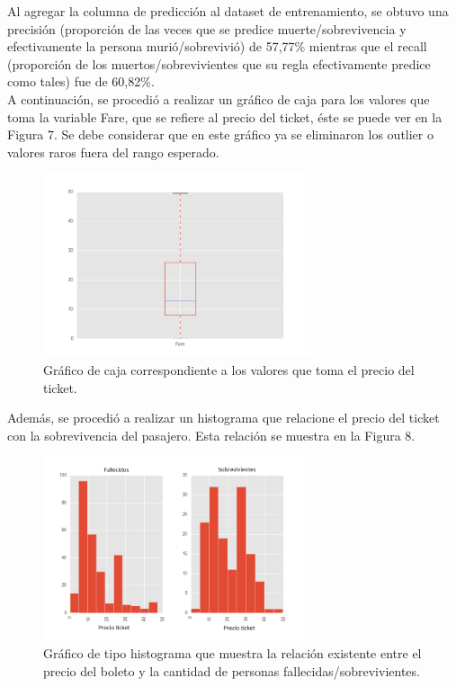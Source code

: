 \documentclass[letter, 10pt]{article}
\begin{document}
Al agregar la columna de predicción al dataset de entrenamiento, se obtuvo una precisión (proporción de las veces que se predice muerte/sobrevivencia y efectivamente la persona murió/sobrevivió) de 57,77\% mientras que el recall (proporción de los muertos/sobrevivientes que su regla efectivamente predice como tales) fue de 60,82\%.\\

A continuación, se procedió a realizar un gráfico de caja para los valores que toma la variable Fare, que se refiere al precio del ticket, éste se puede ver en la Figura 7. Se debe considerar que en este gráfico ya se eliminaron los outlier o valores raros fuera del rango esperado.

\begin{figure}[H]
\begin{center}
\includegraphics[width=0.7\textwidth]{Images/figure_10.png}
\caption{Gráfico de caja correspondiente a los valores que toma el precio del ticket.}
\end{center}
\end{figure}

Además, se procedió a realizar un histograma que relacione el precio del ticket con la sobrevivencia del pasajero. Esta relación se muestra en la Figura 8.

\begin{figure}[H]
\begin{center}
\includegraphics[width=0.7\textwidth]{Images/figure_11.png}
\caption{Gráfico de tipo histograma que muestra la relación existente entre el precio del boleto y la cantidad de personas fallecidas/sobrevivientes.}
\end{center}
\end{figure}
\end{document}
